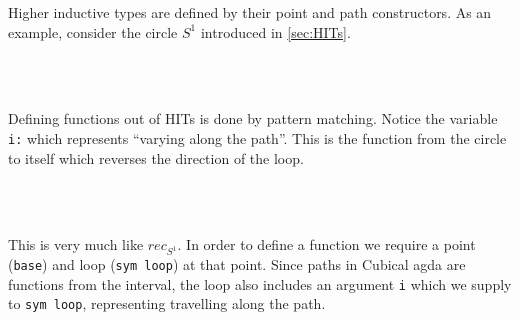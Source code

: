Higher inductive types are defined by their point and path constructors. As an
example, consider the circle $S^1$ introduced in \autoref{sec:HITs}.

\begin{code}%
\>[0]\AgdaSpace{}%
\AgdaSpace{}%
\AgdaSymbol{:}\AgdaSpace{}%
\AgdaSpace{}%
\<%
\\
\>[0][@{}l@{\AgdaIndent{0}}]%
\>[2]\AgdaSpace{}%
\AgdaSymbol{:}\AgdaSpace{}%
\<%
\\
%
\>[2]\AgdaSpace{}%
\AgdaSymbol{:}\AgdaSpace{}%
\AgdaSpace{}%
\AgdaSpace{}%
\<%
\end{code}

Defining functions out of HITs is done by pattern matching. Notice the variable
\texttt{i:\I} which represents ``varying along the path''.
This is the function from the circle to itself which reverses the direction of the loop.

\begin{code}%
\>[0]\AgdaSpace{}%
\AgdaSymbol{:}\AgdaSpace{}%
\AgdaSpace{}%
\AgdaSpace{}%
\<%
\\
\>[0]\AgdaSpace{}%
\AgdaSpace{}%
\AgdaSymbol{=}\AgdaSpace{}%
\<%
\\
\>[0]\AgdaSpace{}%
\AgdaSymbol{(}\AgdaSpace{}%
\AgdaSymbol{)}\AgdaSpace{}%
\AgdaSymbol{=}\AgdaSpace{}%
\AgdaSpace{}%
\AgdaSpace{}%
\<%
\end{code}

This is very much like $rec_{S^1}$. In order to define a function we require a point (\texttt{base})
and loop (\texttt{sym loop}) at that point. Since paths in Cubical agda are functions from the interval,
the loop also includes an argument \texttt{i} which we supply to \texttt{sym loop}, representing
travelling along the path.

